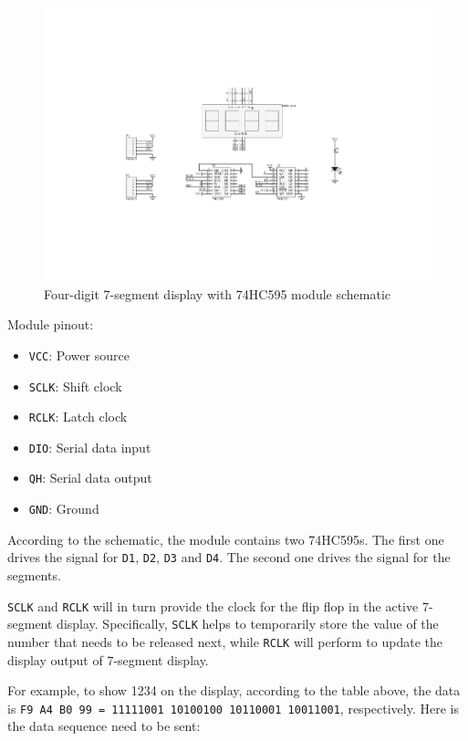 \documentclass[13pt,a4paper,twoside]{report}
\begin{document}
\begin{figure}[H]
\centering
\includegraphics[scale=0.82]{images/7seg_module_schem.pdf}
\caption{Four-digit 7-segment display with 74HC595 module schematic}
\end{figure}

Module pinout:
\begin{multicols}{2}
\begin{itemize}
\item \texttt{VCC}: Power source
\item \texttt{SCLK}: Shift clock
\item \texttt{RCLK}: Latch clock
\item \texttt{DIO}: Serial data input
\item \texttt{QH}: Serial data output
\item \texttt{GND}: Ground
\end{itemize}
\end{multicols}
According to the schematic, the module contains two 74HC595s. The first one drives the signal for \texttt{D1}, \texttt{D2}, \texttt{D3} and \texttt{D4}. The second one drives the signal for the segments. 

\texttt{SCLK} and \texttt{RCLK} will in turn provide the clock for the flip flop in the active 7-segment display. Specifically, \texttt{SCLK} helps to temporarily store the value of the number that needs to be released next, while \texttt{RCLK} will perform to update the display output of 7-segment display.

For example, to show 1234 on the display, according to the table above, the data is \texttt{F9 A4 B0 99 = 11111001 10100100 10110001 10011001}, respectively. Here is the data sequence need to be sent:
\end{document}
